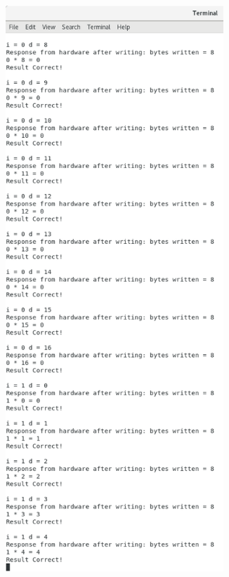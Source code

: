 \documentclass[11pt,letterpaper,titlepage]{article}
\begin{document}
\begin{figure}[h!]
    \centering
    \begin{subfigure}[b]{0.49\textwidth}
    \includegraphics[width=0.9\textwidth]{1.png}

\end{subfigure}
\end{figure}
\end{document}
